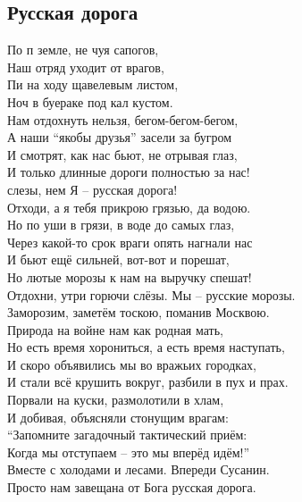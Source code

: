 \documentclass[fleqn,a5paper,12pt,twoside]{guitartabs}
\newcommand{\musVspace}{\vspace{2mm}}
\begin{document}
\newpage
{}%
\subsection*{Русская дорога}
    По п земле, не чуя сапогов,\\
    Наш  отряд уходит от врагов,\\
    Пи на ходу щавелевым листом,\\
    Ноч в буераке под кал кустом.\\
    Нам отдохнуть нельзя, бегом-бегом-бегом,\\
    А наши ``якобы друзья'' засели за бугром\\
    И смотрят, как нас бьют, не отрывая глаз,\\
    И только длинные дороги полностью за нас!\\
    \-\hspace{10mm} слезы,  нем Я -- русская дорога!\\
    \-\hspace{10mm}Отходи, а я тебя прикрою грязью, да водою.\musVspace\\
    Но по уши в грязи, в воде до самых глаз,\\
    Через какой-то срок враги опять нагнали нас\\
    И бьют ещё сильней, вот-вот и порешат,\\
    Но лютые морозы к нам на выручку спешат!\musVspace\\
    \-\hspace{10mm}Отдохни, утри горючи слёзы. Мы -- русские морозы.\\
    \-\hspace{10mm}Заморозим, заметём тоскою, поманив Москвою.\musVspace\\
    Природа на войне нам как родная мать,\\
    Но есть время хорониться, а есть время наступать,\\
    И скоро объявились мы во вражьих городках,\\
    И стали всё крушить вокруг, разбили в пух и прах.\\
    Порвали на куски, размолотили в хлам,\\
    И добивая, объясняли стонущим врагам:\\
    ``Запомните загадочный тактический приём:\\
    Когда мы отступаем -- это мы вперёд идём!''\musVspace\\
    \-\hspace{10mm}Вместе с холодами и лесами. Впереди Сусанин.\\
    \-\hspace{10mm}Просто нам завещана от Бога русская дорога.
 \newpage
{}%
\end{document}
